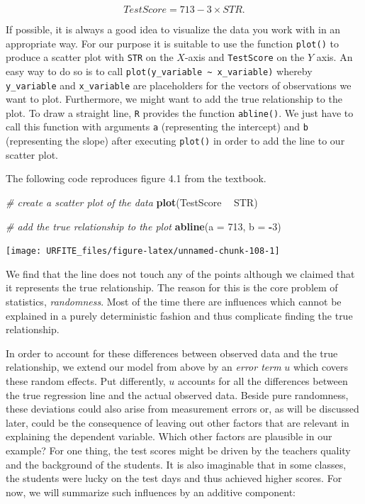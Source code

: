 \documentclass[]{book}
\newenvironment{Shaded}{\begin{snugshade}}{\end{snugshade}}
\newcommand{\KeywordTok}[1]{\textcolor[rgb]{0.13,0.29,0.53}{\textbf{#1}}}
\newcommand{\DataTypeTok}[1]{\textcolor[rgb]{0.13,0.29,0.53}{#1}}
\newcommand{\DecValTok}[1]{\textcolor[rgb]{0.00,0.00,0.81}{#1}}
\newcommand{\StringTok}[1]{\textcolor[rgb]{0.31,0.60,0.02}{#1}}
\newcommand{\CommentTok}[1]{\textcolor[rgb]{0.56,0.35,0.01}{\textit{#1}}}
\newcommand{\OperatorTok}[1]{\textcolor[rgb]{0.81,0.36,0.00}{\textbf{#1}}}
\newcommand{\NormalTok}[1]{#1}
\theoremstyle{definition}
\theoremstyle{definition}
\theoremstyle{definition}
\theoremstyle{remark}
\begin{document}
\[TestScore = 713 - 3 \times STR.\]

If possible, it is always a good idea to visualize the data you work
with in an appropriate way. For our purpose it is suitable to use the
function \texttt{plot()} to produce a scatter plot with \texttt{STR} on
the \(X\)-axis and \texttt{TestScore} on the \(Y\) axis. An easy way to
do so is to call
\texttt{plot(y\_variable\ \textasciitilde{}\ x\_variable)} whereby
\texttt{y\_variable} and \texttt{x\_variable} are placeholders for the
vectors of observations we want to plot. Furthermore, we might want to
add the true relationship to the plot. To draw a straight line,
\texttt{R} provides the function \texttt{abline()}. We just have to call
this function with arguments \texttt{a} (representing the intercept) and
\texttt{b} (representing the slope) after executing \texttt{plot()} in
order to add the line to our scatter plot.

The following code reproduces figure 4.1 from the textbook.

\begin{Shaded}
\begin{Highlighting}[]
\CommentTok{# create a scatter plot of the data}
\KeywordTok{plot}\NormalTok{(TestScore }\OperatorTok{~}\StringTok{ }\NormalTok{STR)}

\CommentTok{# add the true relationship to the plot}
\KeywordTok{abline}\NormalTok{(}\DataTypeTok{a =} \DecValTok{713}\NormalTok{, }\DataTypeTok{b =} \OperatorTok{-}\DecValTok{3}\NormalTok{)}
\end{Highlighting}
\end{Shaded}

\begin{center}\texttt{[image: URFITE\_files/figure-latex/unnamed-chunk-108-1]} \end{center}

We find that the line does not touch any of the points although we
claimed that it represents the true relationship. The reason for this is
the core problem of statistics, \emph{randomness}. Most of the time
there are influences which cannot be explained in a purely deterministic
fashion and thus complicate finding the true relationship.

In order to account for these differences between observed data and the
true relationship, we extend our model from above by an \emph{error
term} \(u\) which covers these random effects. Put differently, \(u\)
accounts for all the differences between the true regression line and
the actual observed data. Beside pure randomness, these deviations could
also arise from measurement errors or, as will be discussed later, could
be the consequence of leaving out other factors that are relevant in
explaining the dependent variable. Which other factors are plausible in
our example? For one thing, the test scores might be driven by the
teachers quality and the background of the students. It is also
imaginable that in some classes, the students were lucky on the test
days and thus achieved higher scores. For now, we will summarize such
influences by an additive component:
\end{document}
